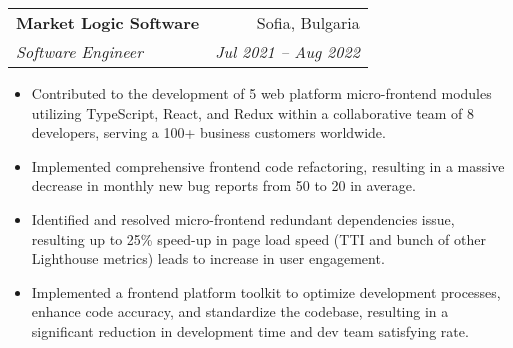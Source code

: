 \documentclass[letterpaper,11pt]{article}
\makeatletter
\newif\ifrussian
\newcommand{\text}[2]{%
  \ifrussian#2\else#1\fi%
}
\newcommand{\resumeItem}[1]{
  \item\small{
    {#1 \vspace{-2pt}}
  }
}
\newcommand{\resumeSubheading}[4]{
  \vspace{-1pt}\item
    \begin{tabular*}{0.97\textwidth}[t]{l@{\extracolsep{\fill}}r}
      \textbf{#1} & #2 \\
      \textit{\small#3} & \textit{\small #4} \\
    \end{tabular*}\vspace{-5pt}
}
\newcommand{\resumeItemListStart}{\begin{itemize}}
\newcommand{\resumeItemListEnd}{\end{itemize}\vspace{-5pt}}
\makeatother
\begin{document}

\resumeSubheading
{\text
  {Market Logic Software}
  {Market Logic Software}}
{\text
  {Sofia, Bulgaria}
  {София, Болгария}}
{\text
  {Software Engineer}
  {Разработчик}}
{\text
  {Jul 2021 -- Aug 2022}
  {Июль 2021 -- Авг. 2022}}
\resumeItemListStart
\resumeItem
{\text
  {Contributed to the development of 5 web platform micro-frontend modules utilizing TypeScript, React, and Redux within a collaborative team of 8 developers, serving a 100+ business customers worldwide.}
  {Внес вклад в разработку 5 микро-фронтендов веб-платформы, используя TypeScript, React и Redux в команде из 8 разработчиков, обслуживающих 100+ клиентов в бизнесе.}}
\resumeItem
{\text
  {Implemented comprehensive frontend code refactoring, resulting in a massive decrease in monthly new bug reports from 50 to 20 in average.}
  {Реализовал комплексный рефакторинг фронтенда, что привело к значительному сокращению ежемесячного количества новых багов с 50 до 20.}}
\resumeItem
{\text
  {Identified and resolved micro-frontend redundant dependencies issue, resulting up to 25\% speed-up in page load speed (TTI and bunch of other Lighthouse metrics) leads to increase in user engagement.}
  {Определил и устранил проблему лишних зависимостей в микро-фронтендах, что привело к росту скорости загрузки страницы до 25\% (TTI + метрики Lighthouse) и увеличению пользовательской вовлеченности.}}
\resumeItem
{\text
  {Implemented a frontend platform toolkit to optimize development processes, enhance code accuracy, and standardize the codebase, resulting in a significant reduction in development time and dev team satisfying rate.}
  {Реализовал инструмент для оптимизации процессов разработки и повышения стандартизации кода, что привело к значительному сокращению времени разработки и росту удовлетворенности разработчиков.}}
\resumeItemListEnd
\end{document}
